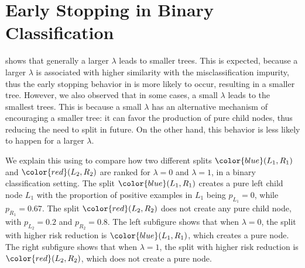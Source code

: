 \documentclass[letterpaper]{article} %
\newcommand{\bp}{{\bm{p}}}
\newcommand{\bn}{{\bm{n}}}
\newcommand{\T}{{\mathsf{T}}}
\newcommand{\I}{\mathds{1}}
\newcommand{\cS}{{\cal{S}}}
\begin{document}


\section{Early Stopping in Binary Classification}
\label{app:alternate_early_stopping}

 shows that generally a larger $\lambda$ leads to smaller trees.
This is expected, because a larger $\lambda$ is associated with higher similarity with the 
misclassification impurity, thus the early stopping behavior in  
is more likely to occur, resulting in a smaller tree.
However, we also observed that in some cases, a small $\lambda$ leads to the smallest trees.
This is because a small $\lambda$ has an alternative mechanism of encouraging a smaller tree:
it can favor the production of pure child nodes, 
thus reducing the need to split in future.
On the other hand, this behavior is less likely to happen for a larger $\lambda$.

We explain this using  to compare how two different splits 
${\color{blue}(L_{1}, R_{1})}$ and ${\color{red}(L_{2}, R_{2})}$
are ranked for $\lambda=0$ and $\lambda=1$, in a binary classification setting.
The split ${\color{blue}(L_{1}, R_{1})}$  creates a pure left child node $L_{1}$ with the proportion of positive
examples in $L_{1}$ being $p_{L_{1}} = 0$, while $p_{R_{1}} = 0.67$.
The split ${\color{red}(L_{2}, R_{2})}$ does not create any pure child node, with
$p_{L_{2}} = 0.2$ and $p_{R_{2}} = 0.8$.
The left subfigure shows that when $\lambda=0$, the split with higher risk reduction is ${\color{blue}(L_{1}, R_{1})}$,
which creates a pure node.
The right subfigure shows that when $\lambda=1$, the split with higher risk reduction is ${\color{red}(L_{2}, R_{2})}$,
which does not create a pure node.
\end{document}
